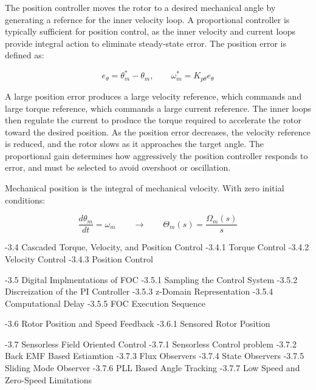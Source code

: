 \documentclass{article}
\begin{document}
The position controller moves the rotor to a desired mechanical angle by generating a refernce for the inner velocity loop. A proportional controller is typically sufficient for position control, as the inner velocity and current loops provide integral action to eliminate steady-state error. The position error is defined as:

\begin{equation}
    e_\theta = \theta_m^* - \theta_m, \qquad
    \omega_m^* = K_{p\theta}e_\theta
\end{equation}

A large position error produces a large velocity reference, which commands and large torque reference, which commands a large current reference. The inner loops then regulate the current to produce the torque required to accelerate the rotor toward the desired position. As the position error decreases, the velocity reference is reduced, and the rotor slows as it approaches the target angle. The proportional gain determines how aggressively the position controller responds to error, and must be selected to avoid overshoot or oscillation.

Mechanical position is the integral of mechanical velocity. With zero initial conditions:

\begin{equation}
    \frac{d\theta_m}{dt} = \omega_m 
    \qquad \longrightarrow \qquad
    \Theta_m(s) = \frac{\Omega_m(s)}{s}
\end{equation}

















-3.4 Cascaded Torque, Velocity, and Position Control
-3.4.1 Torque Control
-3.4.2 Velocity Control
-3.4.3 Position Control

-3.5 Digital Implmentations of FOC
-3.5.1 Sampling the Control System
-3.5.2 Discreization of the PI Controller
-3.5.3 z-Domain Representation
-3.5.4 Computational Delay
-3.5.5 FOC Execution Sequence

-3.6 Rotor Position and Speed Feedback
-3.6.1 Sensored Rotor Position

-3.7 Sensorless Field Oriented Control
-3.7.1 Sensorless Control problem
-3.7.2 Back EMF Based Estiamtion
-3.7.3 Flux Observers
-3.7.4 State Observers
-3.7.5 Sliding Mode Observer
-3.7.6 PLL Based Angle Tracking
-3.7.7 Low Speed and Zero-Speed Limitations




\newpage
\appendix
\renewcommand{\thesection}{\Alph{section}.}





\end{document}
